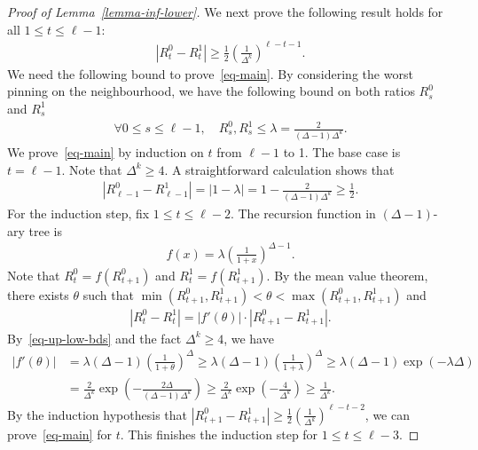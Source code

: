 \documentclass[10pt,a4paper]{article}
\newcommand{\tp}[1]{{\left( #1 \right)}}
\newcommand{\abs}[1]{\ensuremath{\left\vert#1\right\vert}}
\begin{document}
\begin{proof}[Proof of Lemma~\ref{lemma-inf-lower}]
We next prove the following result holds for all $1 \leq t \leq \ell - 1$:
\begin{align}\label{eq-main}
	\abs{R^0_t  - R^1_t } \geq \frac{1}{2}\tp{\frac{1}{\Delta^k}}^{\ell  -t - 1}.
\end{align}
We need the following bound to prove~\eqref{eq-main}.
By considering the worst pinning on the neighbourhood, 
we have the following bound on both ratios $R^0_s$ and $R^1_s$
\begin{align}\label{eq-up-low-bds}
\forall 0\leq s \leq \ell - 1, \quad  R^0_s,R^1_s \leq \lambda = \frac{2}{(\Delta - 1)\Delta^{k}}.
\end{align}
We prove~\eqref{eq-main} by induction on $t$ from $\ell - 1$ to 1.
The base case is $t = \ell - 1$. 
Note that $\Delta^k \geq 4$.
A straightforward calculation shows that
\begin{align*}
	\abs{R^0_{\ell - 1} - R^1_{\ell - 1}} = \abs{ 1 - \lambda} = 1 - \frac{2}{(\Delta - 1)\Delta^{k}} \geq \frac{1}{2}.
\end{align*}
For the induction step, fix $1 \leq t \leq \ell - 2$. %
The recursion function in $(\Delta-1)$-ary tree is
\begin{align*}
	f(x) = \lambda \tp{\frac{1}{1+x}}^{\Delta - 1}.
\end{align*}
Note that $R^0_t = f(R^0_{t+1})$ and $R^1_t = f(R^1_{t+1})$. By the mean value theorem, there exists  $\theta$ such that $\min(R^0_{t+1}, R^1_{t+1}) < \theta < \max(R^0_{t+1}, R^1_{t+1}) $ and 
\begin{align*}
	\abs{R^0_t  - R^1_t } = |f'(\theta)| \cdot  \abs{R^0_{t+1} - R^1_{t+1}}. 
\end{align*}
By~\eqref{eq-up-low-bds} and the fact $\Delta^k \geq 4$, we have
\begin{align*}
	\abs{f'(\theta)} &= \lambda(\Delta - 1) \tp{\frac{1}{1+\theta}}^{\Delta} \geq \lambda(\Delta - 1)\tp{\frac{1}{1+\lambda}}^{\Delta} \geq \lambda(\Delta - 1)\exp(-\lambda\Delta)\\
	&= \frac{2}{\Delta^k} \exp \tp{ - \frac{2\Delta}{(\Delta - 1)\Delta^k} } \geq \frac{2}{\Delta^k} \exp \tp{ - \frac{4}{\Delta^k} } \geq \frac{1}{\Delta^k}.
\end{align*}
By the induction hypothesis that $\abs{R^0_{t+1} - R^1_{t+1}} \geq \frac{1}{2} (\frac{1}{\Delta^k})^{\ell - t - 2} $, we can prove~\eqref{eq-main} for $t$. This finishes the induction step for $1 \leq t \leq \ell - 3$.


\end{proof}
\end{document}
